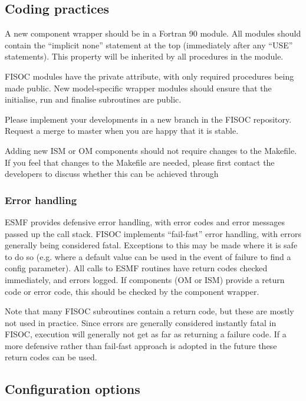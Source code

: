 \documentclass[11pt]{article}
\begin{document}
\subsection{Coding practices}

A new component wrapper  should be in a Fortran 90 module.  
All modules should contain the ``implicit none'' statement at the top (immediately after any 
``USE'' statements).  This property will be inherited by all procedures in the module.

FISOC modules have the private attribute, with only required procedures being 
made public. 
New model-specific wrapper modules should ensure that the initialise, run and finalise 
subroutines are public. 

Please implement your developments in a new branch in the FISOC repository. 
Request a merge to master when you are happy that it is stable. 

Adding new ISM or OM components should not require changes to the Makefile.
If you feel that changes to the Makefile are needed, please first contact the developers
to discuss whether this can be achieved through 


\subsubsection{Error handling}

ESMF provides defensive error handling, with error codes and error messages passed up the 
call stack. 
FISOC implements ``fail-fast'' error handling, with errors generally being considered 
fatal. 
Exceptions to this may be made where it is safe to do so (e.g. where a default value can be 
used in the event of  failure to find a config parameter).
All calls to ESMF routines have return codes checked immediately, and errors logged.
If components (OM or ISM) provide a return code or error code, 
this should be checked by the component wrapper.

Note that many FISOC subroutines contain a return code, but these are mostly not used in 
practice.  Since errors are generally considered instantly fatal in FISOC, execution will 
generally not get as far as returning a failure code. 
If a more defensive rather than fail-fast approach is adopted in the future these return 
codes can be used.



\subsection{Configuration options}
\end{document}
